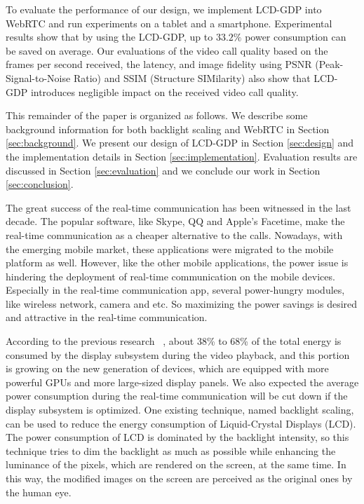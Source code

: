 To evaluate the performance of our design, we implement LCD-GDP into
WebRTC and run experiments on a tablet and a smartphone. Experimental
results show that by using the LCD-GDP, up to $33.2\%$ power
consumption can be saved on average. Our evaluations of the video call
quality based on the frames per second received, the latency, and
image fidelity using PSNR (Peak-Signal-to-Noise Ratio) and SSIM (Structure
SIMilarity) also show that LCD-GDP introduces negligible impact on the
received video call quality.


This remainder of the paper is organized as follows. We describe some background
information for both backlight scaling and WebRTC in Section
\ref{sec:background}. We present our design of LCD-GDP in Section
\ref{sec:design} and the implementation details in Section
\ref{sec:implementation}. Evaluation results are discussed in Section
\ref{sec:evaluation} and we conclude our work in Section
\ref{sec:conclusion}.

The great success of the real-time communication has been witnessed in
the last decade. The popular software, like Skype, QQ and Apple's
Facetime, make the real-time communication as a cheaper alternative to
the calls. Nowadays, with the emerging mobile market, these
applications were migrated to the mobile platform as well. However,
like the other mobile applications, the power issue is hindering the
deployment of real-time communication on the mobile
devices. Especially in the real-time communication app, several
power-hungry modules, like wireless network, camera and etc. So
maximizing the power savings is desired and attractive in the
real-time communication.


According to the previous research ~\cite{AG10}, about 38\% to 68\% of the
total energy is consumed by the display subsystem during the video
playback, and this portion is growing on the new generation of
devices, which are equipped with more powerful GPUs and more
large-sized display panels. We also expected the average power
consumption during the real-time communication will be cut down if the
display subsystem is optimized. One existing technique, named
backlight scaling, can be used to reduce the energy consumption of
Liquid-Crystal Displays (LCD). The power consumption of LCD is
dominated by the backlight intensity, so this technique tries to dim
the backlight as much as possible while enhancing the luminance of the
pixels, which are rendered on the screen, at the same time. In this
way, the modified images on the screen are perceived as the original
ones by the human eye.  


